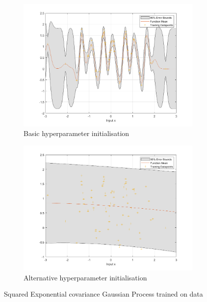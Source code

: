 \documentclass[]{article}
\begin{document}
\begin{figure}[!h]
	\begin{subfigure}{0.5\linewidth}
		\centering
		\includegraphics[width=\linewidth]{1a}
		\caption{Basic hyperparameter initialisation}
		\label{fig:1a}
	\end{subfigure}
	\begin{subfigure}{0.5\linewidth}
		\centering
		\includegraphics[width=\linewidth]{1b}
		\caption{Alternative hyperparameter initialisation}
		\label{fig:1b}
	\end{subfigure}
	\caption{Squared Exponential covariance Gaussian Process trained on data}
	\label{fig:1}
\end{figure}
\end{document}
